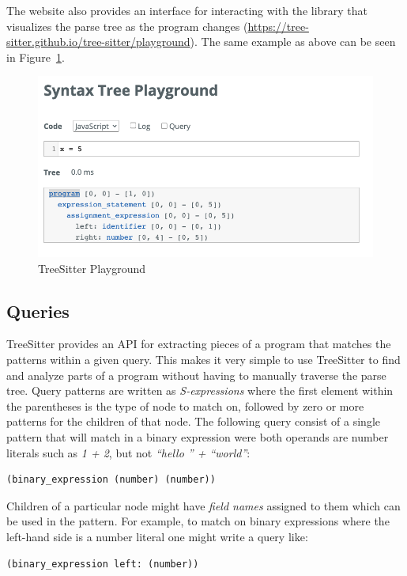 \documentclass[../thesis.tex]{subfiles}
\begin{document}
The website also provides an interface for interacting with the library
that visualizes the parse tree as the program changes (\url{https://tree-sitter.github.io/tree-sitter/playground}).
The same example as above can be seen in Figure~\ref{fig:playground}. 

\begin{figure}[htpb]
    \centering
    \includegraphics[width=0.8\linewidth]{images/playground.png}
    \caption{TreeSitter Playground}%
    \label{fig:playground}
\end{figure}

\subsection{Queries}%
\label{sub:queries}
TreeSitter provides an API for extracting pieces of a program that matches the patterns within a given query.
This makes it very simple to use TreeSitter to find and analyze parts of a program without having to manually
traverse the parse tree.
Query patterns are written as \textit{S-expressions} where the first element within the parentheses
is the type of node to match on, followed by zero or more patterns for the children of that node.
The following query consist of a single pattern that will match in a binary expression were both operands are number literals
such as \textit{1 + 2}, but not \textit{``hello '' + ``world''}:
\begin{verbatim}
(binary_expression (number) (number))
\end{verbatim}

Children of a particular node might have \textit{field names} assigned to them 
which can be used in the pattern.
For example, to match on binary expressions where the left-hand side is a number literal
one might write a query like:
\begin{verbatim}
(binary_expression left: (number))
\end{verbatim}
\end{document}

